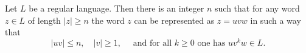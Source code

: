 

\setcounter{section}{3}
\setcounter{subsection}{2}
\setcounter{dfn}{4}

\begin{thm}
Let $L$ be a regular language.
Then there is an integer $n$ such that for any word $z \in L$ of length $|z| \ge n$ the word $z$ can be represented as $z = uvw$ in such a way that
\[
|uv| \le n, \quad |v| \ge 1, \quad \text{ and for all }k \ge 0 \text{ one has } uv^kw \in L.
\]
\end{thm}

